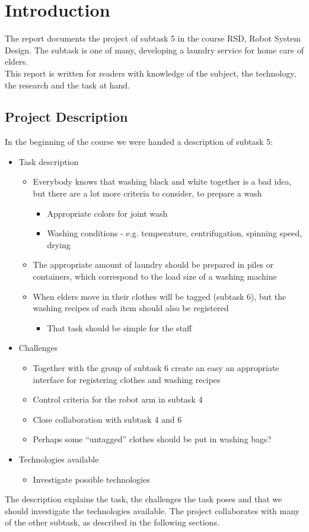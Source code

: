 \section{Introduction}

The report documents the project of subtask 5 in the course RSD, Robot System Design. The subtask is one of many, developing a laundry service for home care of elders. \\ This report is written for readers with knowledge of the subject, the technology, the research and the task at hand.

\subsection{Project Description}

In the beginning of the course we were handed a description of subtask 5:

\begin{itemize}
\item Task description
	\begin{itemize}
	\item Everybody knows that washing black and white together is a bad idea, but there are a lot more criteria to consider, to prepare a wash
		\begin{itemize}
		\item Appropriate colors for joint wash
		\item Washing conditions - e.g. temperature, centrifugation, spinning speed, drying
		\end{itemize}
	\item The appropriate amount of laundry should be prepared in piles or containers, which correspond to the load size of a washing machine
	\item When elders move in their clothes will be tagged (subtask 6), but the washing recipes of each item should also be registered
		\begin{itemize}
		\item That task should be simple for the staff
		\end{itemize}
	\end{itemize}
\item Challenges
	\begin{itemize}
	\item Together with the group of subtask 6 create an easy an appropriate interface for registering clothes and washing recipes
	\item Control criteria for the robot arm in subtask 4
	\item Close collaboration with subtask 4 and 6
	\item Perhaps some “untagged” clothes should be put in washing bags?
	\end{itemize}
\item Technologies available
	\begin{itemize}
	\item Investigate possible technologies
	\end{itemize}
\end{itemize}

The description explains the task, the challenges the task poses and that we should investigate the technologies available. The project collaborates with many of the other subtask, as described in the following sections.
